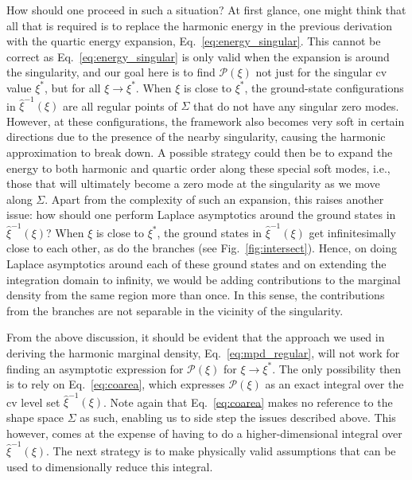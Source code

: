 How should one proceed in such a situation?
At first glance, one might think that all that is required is to replace the harmonic energy in the previous derivation with the quartic energy expansion, Eq.~\eqref{eq:energy_singular}.
This cannot be correct as Eq.~\eqref{eq:energy_singular} is only valid when the expansion is around the singularity, and our goal here is to find $\mathscr{P}(\xi)$ not just for the singular \ac{cv} value $\xi^{*}$, but for all $\xi \to \xi^{*}$.
When $\xi$ is close to $\xi^{*}$, the ground-state configurations in $\hat{\xi}^{-1}(\xi)$ are all regular points of $\Sigma$ that do not have any singular zero modes.
However, at these configurations, the framework also becomes very soft in certain directions due to the presence of the nearby singularity, causing the harmonic approximation to break down.
A possible strategy could then be to expand the energy to both harmonic and quartic order along these special soft modes, i.e., those that will ultimately become a zero mode at the singularity as we move along $\Sigma$.
Apart from the complexity of such an expansion, this raises another issue: how should one perform Laplace asymptotics around the ground states in $\hat{\xi}^{-1}(\xi)$?
When $\xi$ is close to $\xi^{*}$, the ground states in $\hat{\xi}^{-1}(\xi)$ get infinitesimally close to each other, as do the branches (see Fig.~\ref{fig:intersect}).
Hence, on doing Laplace asymptotics around each of these ground states and on extending the integration domain to infinity, we would be adding contributions to the marginal density from the same region more than once.
In this sense, the contributions from the branches are not separable in the vicinity of the singularity.

From the above discussion, it should be evident that the approach we used in deriving the harmonic marginal density, Eq.~\eqref{eq:mpd_regular}, will not work for finding an asymptotic expression for $\mathscr{P}(\xi)$ for $\xi \to \xi^{*}$.
The only possibility then is to rely on Eq.~\eqref{eq:coarea}, which expresses $\mathscr{P}(\xi)$ as an exact integral over the \ac{cv} level set $\hat{\xi}^{-1}(\xi)$.
Note again that Eq.~\eqref{eq:coarea} makes no reference to the shape space $\Sigma$ as such, enabling us to side step the issues described above.
This however, comes at the expense of having to do a higher-dimensional integral over $\hat{\xi}^{-1}(\xi)$.
The next strategy is to make physically valid assumptions that can be used to dimensionally reduce this integral.

